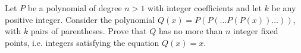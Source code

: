 Let $P$ be a polynomial of degree $n > 1$ with integer coefficients and let $k$ be any positive integer. Consider the polynomial $Q(x) = P(P(\ldots P(P(x))\ldots))$, with $k$ pairs of parentheses. Prove that $Q$ has no more than $n$ integer fixed points, i.e. integers satisfying the equation $Q(x) = x$.
